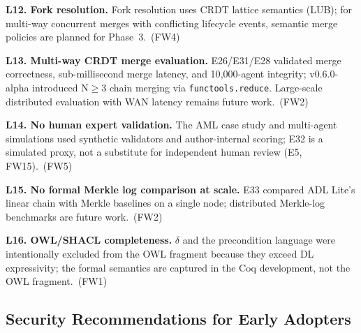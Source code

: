 \textbf{L12. Fork resolution.} Fork resolution uses CRDT lattice semantics (LUB); for multi-way concurrent merges with conflicting lifecycle events, semantic merge policies are planned for Phase~3.~(FW4)

\textbf{L13. Multi-way CRDT merge evaluation.} E26/E31/E28 validated merge correctness, sub-millisecond merge latency, and 10{,}000-agent integrity; v0.6.0-alpha introduced N$\geq$3 chain merging via \texttt{functools.reduce}. Large-scale distributed evaluation with WAN latency remains future work.~(FW2)

\textbf{L14. No human expert validation.} The AML case study and multi-agent simulations used synthetic validators and author-internal scoring; E32 is a simulated proxy, not a substitute for independent human review (E5, FW15).~(FW5)

\textbf{L15. No formal Merkle log comparison at scale.} E33 compared ADL Lite's linear chain with Merkle baselines on a single node; distributed Merkle-log benchmarks are future work.~(FW2)

\textbf{L16. OWL/SHACL completeness.} $\delta$ and the precondition language were intentionally excluded from the OWL fragment because they exceed DL expressivity; the formal semantics are captured in the Coq development, not the OWL fragment.~(FW1)

\subsection{Security Recommendations for Early Adopters}\label{subsec:security-recommendations}

